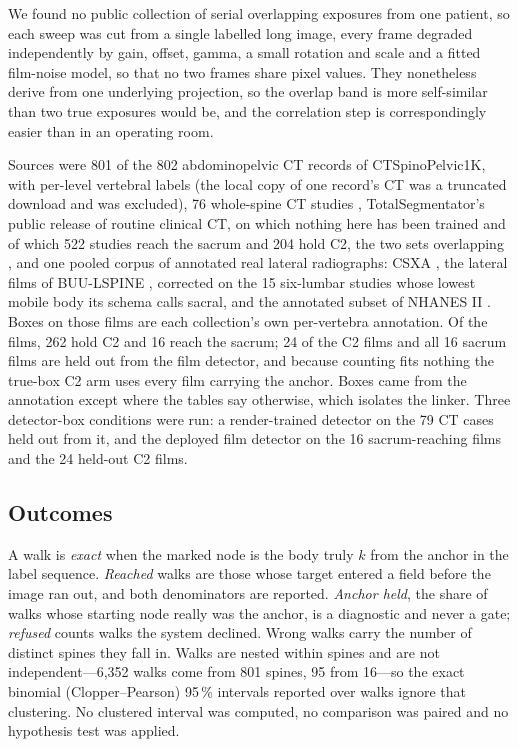 \documentclass[11pt,letterpaper]{article}
\begin{document}
We found no public collection of serial overlapping exposures from one patient, so each sweep was cut from
a single labelled long image, every frame degraded independently by gain, offset, gamma, a small rotation
and scale and a fitted film-noise model, so that no two frames share pixel values. They nonetheless derive
from one underlying projection, so the overlap band is more self-similar than two true exposures would be,
and the correlation step is correspondingly easier than in an operating room.

Sources were 801 of the 802 abdominopelvic CT records of CTSpinoPelvic1K, with per-level vertebral
labels \citep{ctsp1k} (the local copy of one record's CT was a truncated download and was excluded), 76 whole-spine
CT studies \citep{verse2021}, TotalSegmentator's public release of routine clinical CT, on which nothing
here has been trained and of which 522 studies reach the sacrum and 204 hold C2, the two sets overlapping
\citep{totalsegmentator}, and one pooled corpus of annotated real lateral radiographs: CSXA \citep{csxa},
the lateral films of BUU-LSPINE \citep{buu2023}, corrected on the 15 six-lumbar studies whose lowest
mobile body its schema calls sacral, and the annotated subset of NHANES II \citep{nhanes}. Boxes on those
films are each collection's own per-vertebra annotation. Of the films, 262 hold C2 and 16 reach the
sacrum; 24 of the C2 films and all 16 sacrum films are held out from the film detector, and because
counting fits nothing the true-box C2 arm uses every film carrying the anchor. Boxes came from the
annotation except where the tables say otherwise, which isolates the linker. Three detector-box conditions
were run: a render-trained detector on the 79 CT cases held out from it, and the deployed film detector on
the 16 sacrum-reaching films and the 24 held-out C2 films.

\subsection*{Outcomes}
A walk is \emph{exact} when the marked node is the body truly $k$ from the anchor in the label sequence.
\emph{Reached} walks are those whose target entered a field before the image ran out, and both denominators
are reported. \emph{Anchor held}, the share of walks whose starting node really was the anchor, is a
diagnostic and never a gate;
\emph{refused} counts walks the system declined. Wrong walks carry the number of distinct spines they fall
in. Walks are nested within spines and are not independent---6{,}352 walks come from 801 spines, 95 from
16---so the exact binomial (Clopper--Pearson) 95\,\% intervals reported over walks ignore that clustering.
No clustered interval was computed, no comparison was paired and no hypothesis test was applied.
\end{document}
